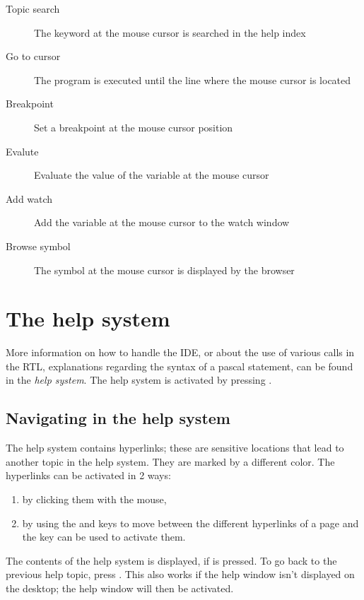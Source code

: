 \begin{description}
\item [Topic search] The keyword at the mouse cursor is searched in the
help index
\item [Go to cursor] The program is executed until the line where
the mouse cursor is located
\item [Breakpoint] Set a breakpoint at the mouse cursor position
\item [Evalute] Evaluate the value of the variable at the mouse
cursor
\item [Add watch] Add the variable at the mouse cursor to the
watch window
\item [Browse symbol] The symbol at the mouse cursor is displayed
by the browser
\end{description}


\section{The help system}

More information on how to handle the IDE, or about the use of various
calls in the RTL, explanations regarding the syntax of a pascal statement,
can be found in the \emph{help system}. The help system is activated
by pressing .

\subsection{Navigating in the help system}
The help system contains hyperlinks; these are sensitive locations that
lead to another topic in the help system. They are marked by a different
color. The hyperlinks can be activated in 2 ways:
\begin{enumerate}
\item by clicking them with the mouse,
\item by using the  and  keys to move between 
the different hyperlinks of a page and the  key can be used 
to activate them.
\end{enumerate}

The contents of the help system is displayed, if  is
pressed. To go back to the previous help topic, press . 
This also works if the help window isn't displayed on the desktop; the help
window will then be activated.

%
%
